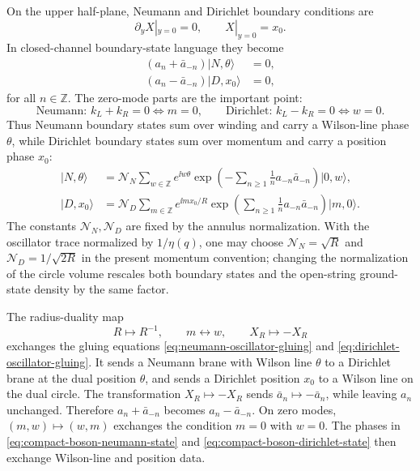 On the upper half-plane, Neumann and Dirichlet boundary conditions are
\[
  \partial_yX|_{y=0}=0,
  \qquad
  X|_{y=0}=x_0 .
\]
In closed-channel boundary-state language they become
\begin{align}
  (a_n+\bar a_{-n})|N,\theta\rangle&=0,
  \label{eq:neumann-oscillator-gluing}\\
  (a_n-\bar a_{-n})|D,x_0\rangle&=0,
  \label{eq:dirichlet-oscillator-gluing}
\end{align}
for all \(n\in\mathbb Z\).  The zero-mode parts are the important point:
\[
  \text{Neumann: } k_L+k_R=0\iff m=0,
  \qquad
  \text{Dirichlet: } k_L-k_R=0\iff w=0 .
\]
Thus Neumann boundary states sum over winding and carry a Wilson-line phase
\(\theta\), while Dirichlet boundary states sum over momentum and carry a
position phase \(x_0\):
\begin{align}
  |N,\theta\rangle
  &=
  \mathcal N_N
  \sum_{w\in\mathbb Z}
  e^{\ii w\theta}
  \exp\!\left(
    -\sum_{n\ge1}\frac1n a_{-n}\bar a_{-n}
  \right)|0,w\rangle,
  \label{eq:compact-boson-neumann-state}\\
  |D,x_0\rangle
  &=
  \mathcal N_D
  \sum_{m\in\mathbb Z}
  e^{\ii m x_0/R}
  \exp\!\left(
    \sum_{n\ge1}\frac1n a_{-n}\bar a_{-n}
  \right)|m,0\rangle .
  \label{eq:compact-boson-dirichlet-state}
\end{align}
The constants \(\mathcal N_N,\mathcal N_D\) are fixed by the annulus
normalization.  With the oscillator trace normalized by \(1/\eta(q)\), one
may choose \(\mathcal N_N=\sqrt R\) and
\(\mathcal N_D=1/\sqrt{2R}\) in the present momentum convention; changing
the normalization of the circle volume rescales both boundary states and
the open-string ground-state density by the same factor.

The radius-duality map
\[
  R\longmapsto R^{-1},
  \qquad
  m\longleftrightarrow w,
  \qquad
  X_R\longmapsto -X_R
\]
exchanges the gluing equations
\eqref{eq:neumann-oscillator-gluing} and
\eqref{eq:dirichlet-oscillator-gluing}.  It sends a Neumann brane with
Wilson line \(\theta\) to a Dirichlet brane at the dual position \(\theta\),
and sends a Dirichlet position \(x_0\) to a Wilson line on the dual circle.
The transformation \(X_R\mapsto -X_R\) sends
\(\bar a_n\mapsto-\bar a_n\), while leaving \(a_n\) unchanged.  Therefore
\(a_n+\bar a_{-n}\) becomes \(a_n-\bar a_{-n}\).  On zero modes,
\((m,w)\mapsto(w,m)\) exchanges the condition \(m=0\) with \(w=0\).  The
phases in \eqref{eq:compact-boson-neumann-state} and
\eqref{eq:compact-boson-dirichlet-state} then exchange Wilson-line and
position data.

